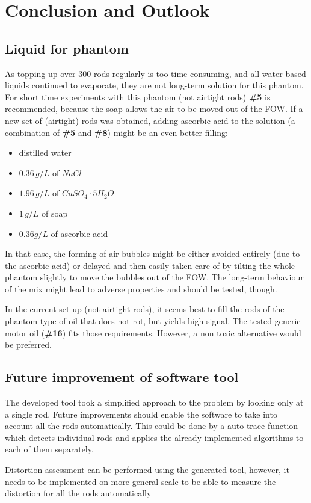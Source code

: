 
\chapter{Conclusion and Outlook}
\section{Liquid for phantom}

As topping up over 300 rods regularly is too time consuming, and all water-based liquids continued to evaporate, they are not long-term solution for this phantom.
For short time experiments with this phantom (not airtight rods) \textbf{\#5} is recommended, because the soap allows the air to be moved out of the FOW.
If a new set of (airtight) rods was obtained, adding ascorbic acid to the solution (a combination of \textbf{\#5} and \textbf{\#8}) might be an even better filling:
\begin{itemize}
\item  distilled water
\item  $0.36 \, g/L$ of $NaCl$
\item  $1.96 \, g/L$ of $CuSO_4\cdot5H_2O$
\item  $1 \, g/L$ of soap
\item  $0.36 g/L$ of ascorbic acid
\end{itemize}
In that case, the forming of air bubbles might be either avoided entirely (due to the ascorbic acid) or delayed and then easily taken care of by tilting the whole phantom slightly to move the bubbles out of the FOW.
The long-term behaviour of the mix might lead to adverse properties and should be tested, though.

In the current set-up (not airtight rods), it seems best to fill the rods of the phantom type of oil that does not rot, but yields high signal.
The tested generic motor oil (\textbf{\#16}) fits those requirements.
However, a non toxic alternative would be preferred.


    
\section{Future improvement of software tool}

The developed tool took a simplified approach to the problem by looking only at a single rod.
Future improvements should enable the software to take into account all the rods automatically.
This could be done by a auto-trace function which detects individual rods and applies the already implemented algorithms to each of them separately. 

Distortion assessment can be performed using the generated tool, however, it needs to be implemented on more general scale to be able to measure the distortion for all the rods automatically
